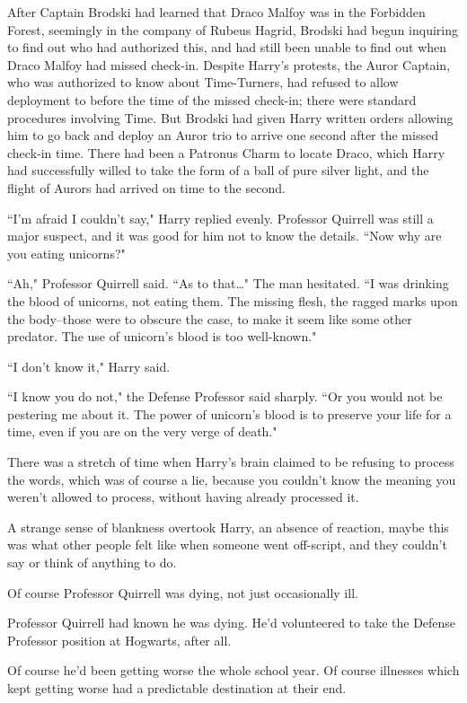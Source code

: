 After Captain Brodski had learned that Draco Malfoy was in the Forbidden Forest, seemingly in the company of Rubeus Hagrid, Brodski had begun inquiring to find out who had authorized this, and had still been unable to find out when Draco Malfoy had missed check-in. Despite Harry's protests, the Auror Captain, who was authorized to know about Time-Turners, had refused to allow deployment to before the time of the missed check-in; there were standard procedures involving Time. But Brodski had given Harry written orders allowing him to go back and deploy an Auror trio to arrive one second after the missed check-in time. There had been a Patronus Charm to locate Draco, which Harry had successfully willed to take the form of a ball of pure silver light, and the flight of Aurors had arrived on time to the second.

``I'm afraid I couldn't say," Harry replied evenly. Professor Quirrell was still a major suspect, and it was good for him not to know the details. ``Now why are you eating unicorns?"

``Ah," Professor Quirrell said. ``As to that{\ldots}" The man hesitated. ``I was drinking the blood of unicorns, not eating them. The missing flesh, the ragged marks upon the body\---those were to obscure the case, to make it seem like some other predator. The use of unicorn's blood is too well-known."

``I don't know it," Harry said.

``I know you do not," the Defense Professor said sharply. ``Or you would not be pestering me about it. The power of unicorn's blood is to preserve your life for a time, even if you are on the very verge of death."

There was a stretch of time when Harry's brain claimed to be refusing to process the words, which was of course a lie, because you couldn't know the meaning you weren't allowed to process, without having already processed it.

A strange sense of blankness overtook Harry, an absence of reaction, maybe this was what other people felt like when someone went off-script, and they couldn't say or think of anything to do.

Of course Professor Quirrell was dying, not just occasionally ill.

Professor Quirrell had known he was dying. He'd volunteered to take the Defense Professor position at Hogwarts, after all.

Of course he'd been getting worse the whole school year. Of course illnesses which kept getting worse had a predictable destination at their end.

